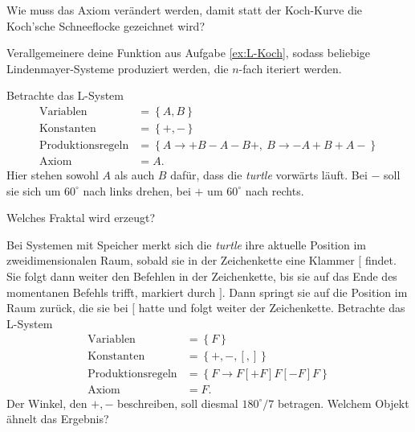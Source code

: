     Wie muss das Axiom ver\"andert werden, damit statt der Koch-Kurve
    die Koch'sche Schneeflocke gezeichnet wird?

\subexercise[
    topic = Allgemeine L-Systeme
]
\label{ex:L-allg}
Verallgemeinere deine Funktion aus Aufgabe \ref{ex:L-Koch}, sodass beliebige
Lindenmayer-Systeme produziert werden, die $n$-fach iteriert werden.

\exercise[
    topic = Fraktale erzeugen
]
Betrachte das L-System
\begin{subequations}
    \label{eq:Sierpinski-L}
\begin{align}
    \mathrm{Variablen} &= \left\{A,B\right\} \\
    \mathrm{Konstanten} &= \left\{+,-\right\} \\
    \mathrm{Produktionsregeln} &= \left\{A\rightarrow +B-A-B+,\
        B\rightarrow -A+B+A-\right\} \\
    \mathrm{Axiom} &= A.
\end{align}
\end{subequations}
Hier stehen sowohl $A$ als auch $B$ daf\"ur, dass die \emph{turtle}
vorw\"arts l\"auft. Bei $-$ soll sie sich um $60^\circ$ nach links
drehen, bei $+$ um $60^\circ$ nach rechts.

Welches Fraktal wird erzeugt?

\subexercise[  
topic = L-Systeme mit Speicher
]
Bei Systemen mit Speicher merkt sich die \emph{turtle} ihre aktuelle
Position im zweidimensionalen Raum, sobald sie in der Zeichenkette eine Klammer $[$ findet. Sie
folgt dann weiter den Befehlen in der Zeichenkette, bis sie auf das Ende
des momentanen Befehls trifft, markiert durch $]$. Dann springt sie auf
die Position im Raum zur\"uck, die sie bei $[$ hatte und folgt weiter
der Zeichenkette. Betrachte das L-System
\begin{subequations}
    \label{eq:Farn-L}
\begin{align}
    \mathrm{Variablen} &= \left\{F\right\} \\
    \mathrm{Konstanten} &= \left\{+,-,[,]\right\} \\
    \mathrm{Produktionsregeln} &= \left\{ F \rightarrow
        F[+F]F[-F]F\right\}\\
\mathrm{Axiom} &= F.
\end{align}
\end{subequations}
Der Winkel, den $+,-$ beschreiben, soll diesmal $180^\circ/7$ betragen.
Welchem Objekt \"ahnelt das Ergebnis?

